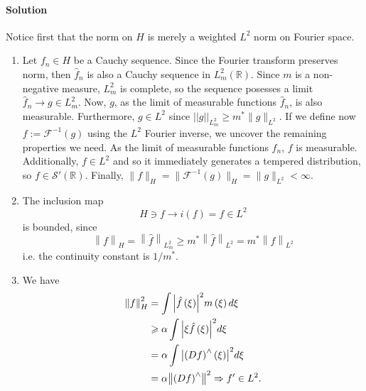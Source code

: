 \documentclass[letterpaper,twoside,11pt]{article}
\theoremstyle{mystyle}
\newcommand{\R}{{\mathbb R}}
\newcommand{\inv}{^{-1}}
\newcommand{\sch}{\mathcal S}
\begin{document}
\paragraph*{Solution} Notice first that the norm on $H$ is merely a weighted $L^2$ norm on Fourier space. 
\begin{enumerate}
  \item Let $f_n \in H$ be a Cauchy sequence. Since the Fourier transform preserves norm, then $\hat f_n$ is also a Cauchy sequence in $L^2_m (\R)$. Since $m$ is a non-negative measure, $L^2_m$ is complete, so the sequence posesses a limit $\hat f_n \to g \in L^2_m$. Now, $g$, as the limit of measurable functions $\hat f_n$, is also measurable. Furthermore, $g \in L^2$ since $||g||_{L^2_m} \geq m^* \|g\|_{L^2}$. If we define now $f := \mathcal F \inv (g)$ using the $L^2$ Fourier inverse, we uncover the remaining properties we need. As the limit of measurable functions $f_n$, $f$ is measurable. Additionally, $f \in L^2$ and so it immediately generates a tempered distribution, so $f \in \sch ' (\R)$. Finally, $\|f\|_H = \|\mathcal F \inv (g) \|_H = \|g\|_{L^2} < \infty$. 
  \item The inclusion map 
  \[H \ni f \to i\left( f \right) = f \in {L^2}\]
  is bounded, since 
  \[{\left\| f \right\|_H} = {\left\| {\hat f} \right\|_{L_m^2}} \geqslant {m^*}{\left\| {\hat f} \right\|_{{L^2}}} = {m^*}{\left\| f \right\|_{{L^2}}}\]
  i.e. the continuity constant is $1/m^*$. 
  \item We have 
  \begin{align*}
    \left\| f \right\|_H^2 &= \int {{{\left| {\hat f\left( \xi  \right)} \right|}^2}m\left( \xi  \right)d\xi }  \hfill \\
     &\geqslant \alpha \int {{{\left| {\xi \hat f\left( \xi  \right)} \right|}^2}d\xi }  \hfill \\
     &= \alpha \int {{{\left| {{{\left( {Df} \right)}^ \wedge }\left( \xi  \right)} \right|}^2}d\xi }  \hfill \\
     &= \alpha {\left\| {{{\left( {Df} \right)}^ \wedge }} \right\|^2} \Rightarrow  f'\in L^2.
  \end{align*}
\end{enumerate}
\end{document}
